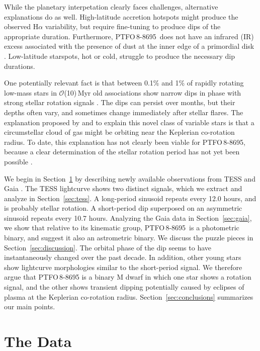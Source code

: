 \documentclass[12pt,twocolumn,tighten]{aastex62}
\newcommand{\ptfo}{PTFO$\,$8-8695}
\begin{document}
While the planetary interpetation clearly faces challenges,
alternative explanations do as well.  High-latitude accretion hotspots
might produce the observed H$\alpha$ variability, but require
fine-tuning to produce dips of the appropriate duration. Furthermore,
\ptfo\ does not have an infrared (IR) excess associated with the
presence of dust at the inner edge of a primordial disk \citep[{\it
e.g.},][Figure~18]{yu_tests_2015}.  Low-latitude starspots, hot or
cold, struggle to produce the necessary dip durations.

One potentially relevant fact is that between 0.1\% and 1\% of rapidly
rotating low-mass stars in $\mathcal{O}$(10)$\,$Myr old associations
show narrow dips in phase with strong stellar rotation signals
\citep{rebull_usco_2018}.  The dips can persist over months, but their
depths often vary, and sometimes change immediately after stellar
flares.  The explanation proposed by \citet{stauffer_orbiting_2017}
and \citet{david_transient_2017} to explain this novel class of
variable stars is that a circumstellar cloud of gas might be orbiting
near the Keplerian co-rotation radius.  To date, this explanation has
not clearly been viable for \ptfo, because a clear determination of
the stellar rotation period has not yet been possible
\citep{van_eyken_ptf_2012,koen_multicolour_2015,raetz_yeti_2016}.

We begin in Section~\ref{sec:observations} by describing newly
available observations from TESS \citep{ricker_transiting_2015} and
Gaia \citep{gaia_collaboration_gaia_2018}.  The TESS lightcurve shows
two distinct signals, which we extract and analyze in
Section~\ref{sec:tess}.  A long-period sinusoid repeats every 12.0
hours, and is probably stellar rotation.  A short-period dip
superposed on an asymmetric sinusoid repeats every 10.7 hours.
Analyzing the Gaia data in Section~\ref{sec:gaia}, we show that
relative to its kinematic group, \ptfo\ is a photometric binary, and
suggest it also an astrometric binary.  We discuss the puzzle pieces
in Section~\ref{sec:discussion}.  The orbital phase of the dip seems
to have instantaneously changed over the past decade.  In addition,
other young stars show lightcurve morphologies similar to the
short-period signal.  We therefore argue that PTFO$\,$8-8695 is a
binary M dwarf in which one star shows a rotation signal, and the
other shows transient dipping potentially caused by eclipses of
plasma at the Keplerian co-rotation radius.
Section~\ref{sec:conclusions} summarizes our main points.


\section{The Data}
\label{sec:observations}
\end{document}
